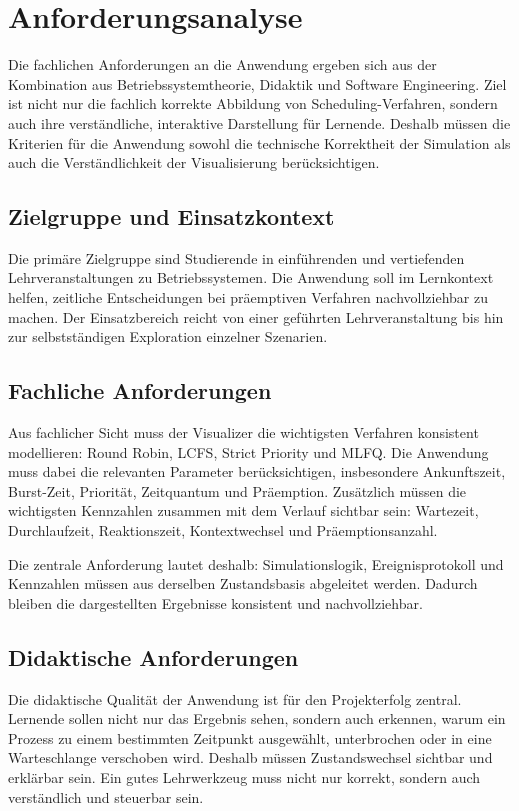 \chapter{Anforderungsanalyse}

Die fachlichen Anforderungen an die Anwendung ergeben sich aus der Kombination aus Betriebssystemtheorie, Didaktik und Software Engineering. Ziel ist nicht nur die fachlich korrekte Abbildung von Scheduling-Verfahren, sondern auch ihre verständliche, interaktive Darstellung für Lernende. Deshalb müssen die Kriterien für die Anwendung sowohl die technische Korrektheit der Simulation als auch die Verständlichkeit der Visualisierung berücksichtigen. 

\section{Zielgruppe und Einsatzkontext}

Die primäre Zielgruppe sind Studierende in einführenden und vertiefenden Lehrveranstaltungen zu Betriebssystemen. Die Anwendung soll im Lernkontext helfen, zeitliche Entscheidungen bei präemptiven Verfahren nachvollziehbar zu machen. Der Einsatzbereich reicht von einer geführten Lehrveranstaltung bis hin zur selbstständigen Exploration einzelner Szenarien.

\section{Fachliche Anforderungen}

Aus fachlicher Sicht muss der Visualizer die wichtigsten Verfahren konsistent modellieren: Round Robin, LCFS, Strict Priority und MLFQ. Die Anwendung muss dabei die relevanten Parameter berücksichtigen, insbesondere Ankunftszeit, Burst-Zeit, Priorität, Zeitquantum und Präemption. Zusätzlich müssen die wichtigsten Kennzahlen zusammen mit dem Verlauf sichtbar sein: Wartezeit, Durchlaufzeit, Reaktionszeit, Kontextwechsel und Präemptionsanzahl.

Die zentrale Anforderung lautet deshalb: Simulationslogik, Ereignisprotokoll und Kennzahlen müssen aus derselben Zustandsbasis abgeleitet werden. Dadurch bleiben die dargestellten Ergebnisse konsistent und nachvollziehbar.

\section{Didaktische Anforderungen}

Die didaktische Qualität der Anwendung ist für den Projekterfolg zentral. Lernende sollen nicht nur das Ergebnis sehen, sondern auch erkennen, warum ein Prozess zu einem bestimmten Zeitpunkt ausgewählt, unterbrochen oder in eine Warteschlange verschoben wird. Deshalb müssen Zustandswechsel sichtbar und erklärbar sein. Ein gutes Lehrwerkzeug muss nicht nur korrekt, sondern auch verständlich und steuerbar sein.

